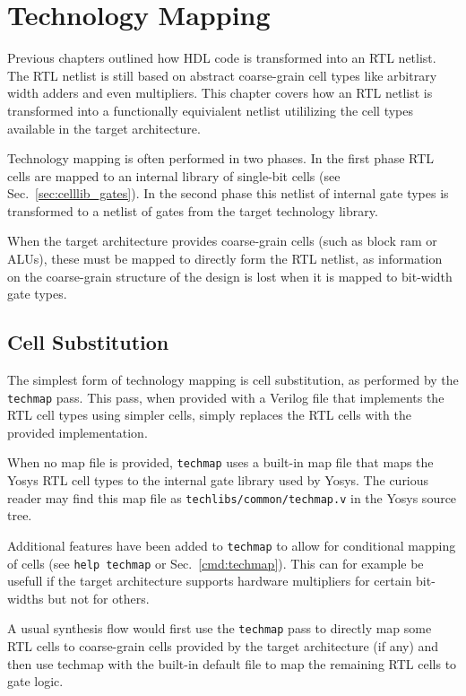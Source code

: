 
\chapter{Technology Mapping}
\label{chapter:techmap}

Previous chapters outlined how HDL code is transformed into an RTL netlist. The
RTL netlist is still based on abstract coarse-grain cell types like arbitrary
width adders and even multipliers. This chapter covers how an RTL netlist is
transformed into a functionally equivialent netlist utililizing the cell types
available in the target architecture.

Technology mapping is often performed in two phases. In the first phase RTL cells
are mapped to an internal library of single-bit cells (see Sec.~\ref{sec:celllib_gates}).
In the second phase this netlist of internal gate types is transformed to a netlist
of gates from the target technology library.

When the target architecture provides coarse-grain cells (such as block ram
or ALUs), these must be mapped to directly form the RTL netlist, as information
on the coarse-grain structure of the design is lost when it is mapped to
bit-width gate types.

\section{Cell Substitution}

The simplest form of technology mapping is cell substitution, as performed by
the {\tt techmap} pass. This pass, when provided with a Verilog file that
implements the RTL cell types using simpler cells, simply replaces the RTL
cells with the provided implementation.

When no map file is provided, {\tt techmap} uses a built-in map file that
maps the Yosys RTL cell types to the internal gate library used by Yosys.
The curious reader may find this map file as {\tt techlibs/common/techmap.v} in
the Yosys source tree.

Additional features have been added to {\tt techmap} to allow for conditional
mapping of cells (see {\tt help techmap} or Sec.~\ref{cmd:techmap}). This can
for example be usefull if the target architecture supports hardware multipliers for
certain bit-widths but not for others.

A usual synthesis flow would first use the {\tt techmap} pass to directly map
some RTL cells to coarse-grain cells provided by the target architecture (if
any) and then use techmap with the built-in default file to map the remaining
RTL cells to gate logic.

